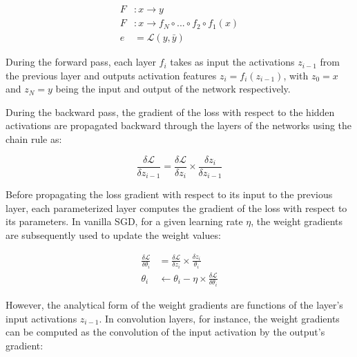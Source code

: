 \documentclass[twocolumn]{bmcart}
\begin{document}
 \begin{subequations}
 	\begin{align}
 	F &: x \rightarrow y \\
 	F &: x \rightarrow f_N \circ ... \circ f_2 \circ f_1(x) \\
 	e &=  \mathcal{L}(y, \bar{y})
 	\end{align}
 \end{subequations}

During the forward pass, each layer $f_i$ takes as input the activations $z_{i-1}$ from the previous layer and outputs activation features $z_i=f_i(z_{i-1})$, with $z_0=x$ and $z_N=y$ being the input and output of the network respectively.

During the backward pass, the gradient of the loss with respect to the hidden activations are propagated backward through the layers of the networks using the chain rule as:


\begin{equation}
\frac{\delta \mathcal{L}}{\delta z_{i-1}} = \frac{\delta \mathcal{L}}{\delta z_{i}}  \times \frac{\delta z_{i}}{\delta z_{i-1}}
\end{equation}

Before propagating the loss gradient with respect to its input to the previous layer, 
each parameterized layer computes the gradient of the loss with respect to its parameters. 
In vanilla SGD, for a given learning rate $\eta$, the weight gradients are subsequently used to update the weight values:

\begin{subequations}
\begin{align}
\frac{\delta \mathcal{L}}{\delta \theta_i} & =\frac{\delta \mathcal{L}}{\delta z_{i}}  \times \frac{\delta z_{i}}{\theta_i} \\
\theta_i & \leftarrow \theta_i - \eta \times \frac{\delta \mathcal{L}}{\delta \theta_i}
\end{align}
\end{subequations}

However, the analytical form of the weight gradients are functions of the layer's input activations $z_{i-1}$. 
In convolution layers, for instance, the weight gradients can be computed as the convolution of the input activation by the output's gradient:
\end{document}
